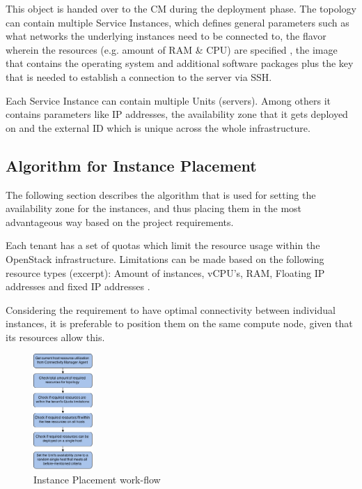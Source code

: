 This object is handed over to the CM during the deployment phase. The topology can contain multiple Service Instances, which defines general parameters such as what networks the underlying instances need to be connected to, the flavor wherein the resources (e.g. amount of RAM \& CPU) are specified \cite{openstack-admin}, the image that contains the operating system and additional software packages plus the key that is needed to establish a connection to the server via SSH.

Each Service Instance can contain multiple Units (servers). Among others it contains parameters like IP addresses, the availability zone that it gets deployed on and the external ID which is unique across the whole infrastructure.

\newpage

\subsection{Algorithm for Instance Placement}

The following section describes the algorithm that is used for setting the availability zone for the instances, and thus placing them in the most advantageous way based on the project requirements.

Each tenant has a set of quotas which limit the resource usage within the OpenStack infrastructure. Limitations can be made based on the following resource types (excerpt): Amount of instances, vCPU's, RAM, Floating IP addresses and fixed IP addresses \cite{openstack-admin}.

Considering the requirement to have optimal connectivity between individual instances, it is preferable to position them on the same compute node, given that its resources allow this.

\begin{figure}[H]
\centering

\includegraphics[width=0.2\textwidth]{images/design/cm_instance_placement_engine.png}

\caption{Instance Placement work-flow}
\end{figure}


